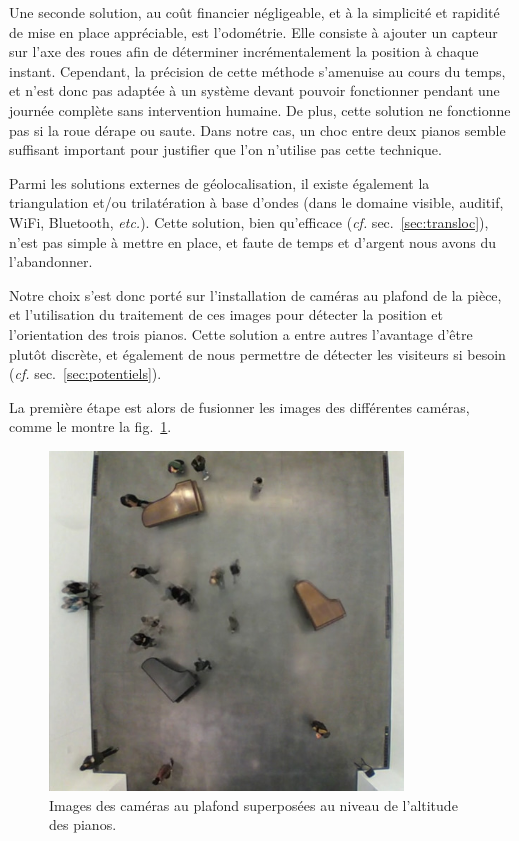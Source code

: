 \documentclass[french,A4paper,]{book}
\begin{document}
Une seconde solution, au coût financier négligeable, et à la simplicité
et rapidité de mise en place appréciable, est l'odométrie. Elle consiste
à ajouter un capteur sur l'axe des roues afin de déterminer
incrémentalement la position à chaque instant. Cependant, la précision
de cette méthode s'amenuise au cours du temps, et n'est donc pas adaptée
à un système devant pouvoir fonctionner pendant une journée complète
sans intervention humaine. De plus, cette solution ne fonctionne pas si
la roue dérape ou saute. Dans notre cas, un choc entre deux pianos
semble suffisant important pour justifier que l'on n'utilise pas cette
technique.

Parmi les solutions externes de géolocalisation, il existe également la
triangulation et/ou trilatération à base d'ondes (dans le domaine
visible, auditif, WiFi, Bluetooth, \emph{etc.}). Cette solution, bien
qu'efficace (\emph{cf.} sec.~\ref{sec:transloc}), n'est pas simple à
mettre en place, et faute de temps et d'argent nous avons du
l'abandonner.

Notre choix s'est donc porté sur l'installation de caméras au plafond de
la pièce, et l'utilisation du traitement de ces images pour détecter la
position et l'orientation des trois pianos. Cette solution a entre
autres l'avantage d'être plutôt discrète, et également de nous permettre
de détecter les visiteurs si besoin (\emph{cf.}
sec.~\ref{sec:potentiels}).

La première étape est alors de fusionner les images des différentes
caméras, comme le montre la fig.~\ref{fig:merged}.

\begin{figure}
\centering
\includegraphics[height=9.00000cm]{imgs/merged.jpg}
\caption{Images des caméras au plafond superposées au niveau de
l'altitude des pianos.}\label{fig:merged}
\end{figure}
\end{document}
